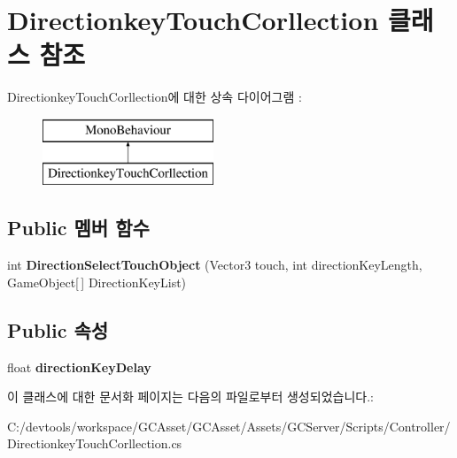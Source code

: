 \hypertarget{class_directionkey_touch_corllection}{}\section{Directionkey\+Touch\+Corllection 클래스 참조}
\label{class_directionkey_touch_corllection}
Directionkey\+Touch\+Corllection에 대한 상속 다이어그램 \+: \begin{figure}[H]
\begin{center}
\leavevmode
\includegraphics[height=2.000000cm]{class_directionkey_touch_corllection}
\end{center}
\end{figure}
\subsection*{Public 멤버 함수}
\begin{DoxyCompactItemize}
\item 
\hypertarget{class_directionkey_touch_corllection_ad8fbc80f645e6626866ba86ec20c8c15}{}int {\bfseries Direction\+Select\+Touch\+Object} (Vector3 touch, int direction\+Key\+Length, Game\+Object\mbox{[}$\,$\mbox{]} Direction\+Key\+List)\label{class_directionkey_touch_corllection_ad8fbc80f645e6626866ba86ec20c8c15}

\end{DoxyCompactItemize}
\subsection*{Public 속성}
\begin{DoxyCompactItemize}
\item 
\hypertarget{class_directionkey_touch_corllection_a248298903643dd083f3119d7153b9e30}{}float {\bfseries direction\+Key\+Delay}\label{class_directionkey_touch_corllection_a248298903643dd083f3119d7153b9e30}

\end{DoxyCompactItemize}


이 클래스에 대한 문서화 페이지는 다음의 파일로부터 생성되었습니다.\+:\begin{DoxyCompactItemize}
\item 
C\+:/devtools/workspace/\+G\+C\+Asset/\+G\+C\+Asset/\+Assets/\+G\+C\+Server/\+Scripts/\+Controller/Directionkey\+Touch\+Corllection.\+cs\end{DoxyCompactItemize}
